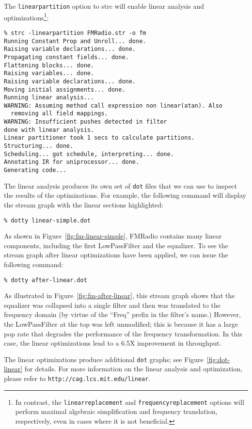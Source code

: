 The {\tt linearpartition} option to strc will enable linear analysis
and optimizations\footnote{In contrast, the {\tt linearreplacement}
and {\tt frequencyreplacement} options will perform maximal algebraic
simplification and frequency translation, respectively, even in cases
where it is not beneficial.}:
{\small
\begin{verbatim}
% strc -linearpartition FMRadio.str -o fm
Running Constant Prop and Unroll... done.
Raising variable declarations... done.
Propagating constant fields... done.
Flattening blocks... done.
Raising variables... done.
Raising variable declarations... done.
Moving initial assignments... done.
Running linear analysis...
WARNING: Assuming method call expression non linear(atan). Also 
  removing all field mappings.
WARNING: Insufficient pushes detected in filter
done with linear analysis.
Linear partitioner took 1 secs to calculate partitions.
Structuring... done.
Scheduling... got schedule, interpreting... done.
Annotating IR for uniprocessor... done.
Generating code...
\end{verbatim}
} 
%
The linear analysis produces its own set of {\tt dot} files that we
can use to inspect the results of the optimizations.  For example, the
following command will display the stream graph with the linear
sections highlighted: {\small
\begin{verbatim}
% dotty linear-simple.dot
\end{verbatim}
} 
%
As shown in Figure~\ref{fig:fm-linear-simple}, FMRadio contains many
linear components, including the first LowPassFilter and the
equalizer.  To see the stream graph after linear optimizations have
been applied, we can issue the following command:
{\small
\begin{verbatim}
% dotty after-linear.dot
\end{verbatim}
} 
%
As illustrated in Figure~\ref{fig:fm-after-linear}, this stream
graph shows that the equalizer was collapsed into a single filter and
then was translated to the frequency domain (by virtue of the ``Freq''
prefix in the filter's name.)  However, the LowPassFilter at the top
was left unmodified; this is because it has a large pop rate that
degrades the performance of the frequency transformation.  In this
case, the linear optimizations lead to a 6.5X improvement in
throughput.

The linear optimizations produce additional {\tt dot} graphs; see
Figure~\ref{fig:dot-linear} for details.  For more information on the
linear analysis and optimization, please refer to {\tt http://cag.lcs.mit.edu/linear}.

